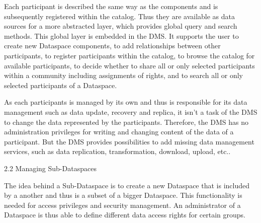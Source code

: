 Each participant is described the same way as the components and is subsequently registered within the catalog. Thus they are available as data sources for a more abstracted layer, which provides global query and search methods. This global layer is embedded in the DMS. It supports the user to create new Dataspace components, to add relationships between other participants, to register participants within the catalog, to browse the catalog for available participants, to decide whether to share all or only  selected participants within a community including assignments of rights, and to search all or only selected participants of a Dataspace.

As each participants is managed by its own and thus is responsible for its data management such as data update, recovery and replica, it isn't a task of the DMS to change the data represented by the participants. Therefore, the DMS has no administration privileges for writing and changing content of the data of a participant. But the DMS provides possibilities to add missing data management services, such as data replication, transformation, download, upload, etc.. 

2.2 Managing Sub-Dataspaces

The idea behind a Sub-Dataspace is to create a new Dataspace that is included by a another and thus is a subset of a  bigger Dataspace. This functionality is needed for access privileges and security management. An administrator of a Dataspace is thus able to define different data access rights for certain groups.  
